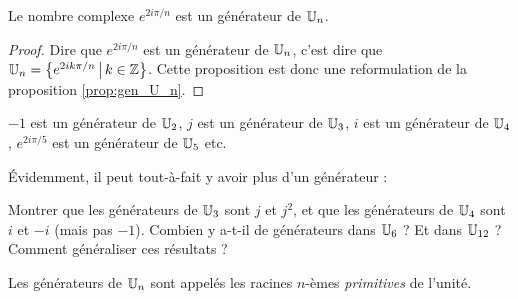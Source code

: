 \begin{proposition}
Le nombre complexe $e^{2i\pi/n}$ est un générateur de $\mathbb{U}_n$.
\end{proposition}
\begin{proof}
Dire que $e^{2i\pi/n}$ est un générateur de $\mathbb{U}_n$, c'est dire que $\U_n=\ensemble{e^{2ik\pi/n}}{k\in \Z}$. Cette proposition est donc une reformulation de la proposition \ref{prop:gen_U_n}.
\end{proof}

\begin{exemples}
$-1$ est un générateur de $\mathbb{U}_2$, $j$ est un générateur de $\mathbb{U}_3$, $i$ est un générateur de $\mathbb{U}_4$, $e^{2i\pi/5}$ est un générateur de $\mathbb{U}_5$ etc.
\end{exemples}

Évidemment, il peut tout-à-fait y avoir plus d'un générateur : 

\begin{exercice}
Montrer que les générateurs de $\mathbb{U}_3$ sont $j$ et $j^2$, et que les générateurs de $\mathbb{U}_4$ sont $i$ et $-i$ (mais pas $-1$). Combien y a-t-il de générateurs dans $\mathbb{U}_6$ ? Et dans $\mathbb{U}_{12}$ ? Comment généraliser ces résultats ?
\end{exercice}

\begin{definition}
Les générateurs de $\mathbb{U}_n$ sont appelés les racines $n$-èmes \emph{primitives} de l'unité.
\end{definition}

